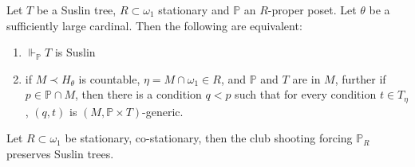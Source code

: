 \documentclass[10pt,a4paper]{amsart}
\newcommand{\forceP}{\mathbb{P}}
\begin{document}
\begin{lemma}\label{preservation of Suslin trees}
 Let $T$ be a Suslin tree, $R \subset \omega_1$ stationary and $\forceP$ an $R$-proper
 poset. Let $\theta$ be a sufficiently large cardinal.
 Then the following are equivalent:
 \begin{enumerate}
  \item $\Vdash_{\forceP} T$ is Suslin
 
  \item if $M \prec H_{\theta}$ is countable, $\eta = M \cap \omega_1 \in R$, and $\forceP$ and $T$ are in $M$,
  further if $p \in \forceP \cap M$, then there is a condition $q<p$ such that 
  for every condition $t \in T_{\eta}$, 
  $(q,t)$ is $(M, \forceP \times T)$-generic.
 \end{enumerate}

\end{lemma}

\begin{lemma}\label{omegadistributive}
Let $R \subset \omega_1$ be stationary, co-stationary, then the club shooting forcing $\forceP_R$ preserves Suslin trees.
\end{lemma}
\end{document}
